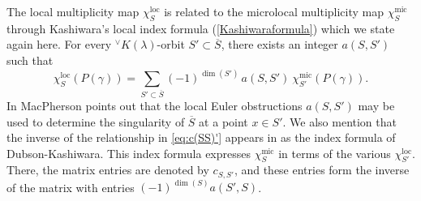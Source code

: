 \documentclass[a4paper, 11pt]{article}
\begin{document}
The local multiplicity map $\chi_{S}^{\mathrm{loc}}$ is related to the
microlocal multiplicity map $\chi_{S}^{\mathrm{mic}}$ through 
Kashiwara's local index formula (\ref{Kashiwaraformula}) which we
state again here.
For every \( {}^{\vee}K(\lambda) \)-orbit \( S' \subset \overline{S}
\), there exists an integer \( a(S, S') \) such that
\begin{equation}\label{eq:c(SS)'}
\chi_{S}^{\mathrm{loc}}(P(\gamma)) = \sum_{S' \subset \overline{S}}
(-1)^{\dim(S')} \, a(S, S') \ \chi_{S'}^{\mathrm{mic}}(P(\gamma)). 
\end{equation}  
In \cite[Section~3]{MacPherson74}  MacPherson points out
that the local Euler obstructions $a(S, S')$ may be used to determine   the
singularity  of $\overline{S}$ at a point $x \in S'$.
We also mention that the inverse of the
relationship in \eqref{eq:c(SS)'} appears in   
\cite[Section 8]{Ginsburg86} as the index formula of Dubson-Kashiwara.
This index formula 
expresses $\chi_{S}^{\mathrm{mic}}$ in terms of the various
$\chi_{S'}^{\mathrm{loc}}$.  There, the matrix entries are
denoted by $c_{S,S'}$, and these entries form the inverse of the matrix
with entries $(-1)^{\dim(S)} a(S',S)$.
\end{document}
